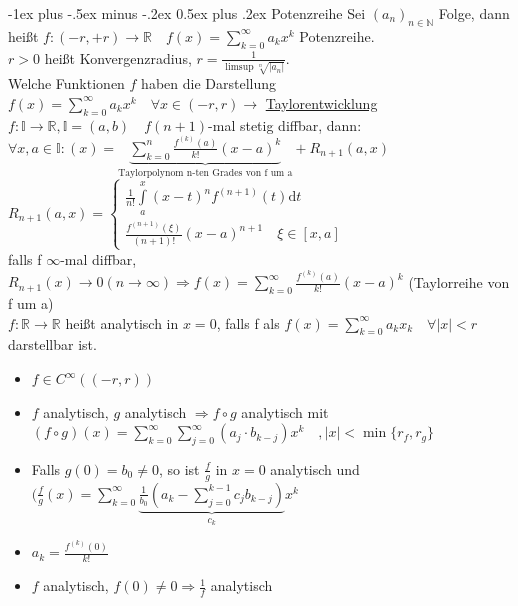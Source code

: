 \documentclass[12pt,a4paper^, twocolumn]{article}
\makeatletter
\newcommand{\menge}{\mathbb} %
\renewcommand{\d}{\mathrm{d}} %
\renewcommand{\section}{\@startsection{section}{1}{0mm}%
                                {-1ex plus -.5ex minus -.2ex}%
                                {0.5ex plus .2ex}%
                                {\normalfont\large\bfseries}}
\makeatother
\begin{document}
\section{Potenzreihe}
	Sei $(a_n)_{n\in \menge{N}}$ Folge, 
	dann heißt $f:(-r,+r) \rightarrow \menge{R} \quad f(x) = \sum\limits_{k=0}^\infty a_kx^k$ Potenzreihe. \\
	$r > 0$ heißt Konvergenzradius, $r = \frac{1}{\limsup \sqrt[n]{|a_n|}}$. \\
	Welche Funktionen $f$ haben die Darstellung $f(x) = \sum\limits_{k=0}^\infty a_kx^k \quad \forall x \in (-r,r) \rightarrow$ \underline{Taylorentwicklung} \\
	$f: \menge{I} \rightarrow \menge{R}, \menge{I} = (a,b) \quad f (n+1)$-mal stetig diffbar, dann: \\
	$\forall x,a \in \menge{I}: (x) = \underbrace{ \sum\limits_{k=0}^{n} \frac{f^{(k)} (a)}{k!}(x-a)^k }_{\text{Taylorpolynom n-ten Grades von f um a}} + R_{n+1}(a,x)$ \\
	$R_{n+1}(a,x) = \begin{cases}
		\frac{1}{n!} \int\limits_a^x(x-t)^nf^{(n+1)}(t) \d t \\
		\frac{f^{(n+1)}(\xi)}{(n+1)!} (x-a)^{n+1} \quad \xi \in [x,a]
	\end{cases}$ \\
	falls f $\infty$-mal diffbar, $R_{n+1}(x) \rightarrow 0 (n \rightarrow \infty)
	\Rightarrow f(x) = \sum\limits_{k=0}^\infty \frac{f^{(k)}(a)}{k!} (x-a)^k$ \quad (Taylorreihe von f um a) \\
	$f:\menge{R} \rightarrow \menge{R}$ heißt analytisch in $x=0$, falls f als $f(x) = \sum\limits_{k=0}^\infty a_k x_k \quad \forall |x| < r$ darstellbar ist.
	\begin{itemize}
		\item $f \in C^\infty((-r,r))$ 
		\item $f$ analytisch, $g$ analytisch $\Rightarrow f \circ g$ analytisch mit\\
			$(f \circ g)(x) = \sum\limits_{k=0}^\infty \sum\limits_{j=0}^\infty (a_j \cdot b_{k-j})x^k \quad , |x| < \min\{r_f, r_g\}$
		\item Falls $g(0) = b_0 \neq 0$, so ist $\frac{f}{g}$ in $x=0$ analytisch und
			$(\frac{f}{g}(x) = \sum\limits_{k=0}^\infty \underbrace{\frac{1}{b_0}(a_k - \sum\limits_{j=0}^{k-1} c_jb_{k-j})}_{c_k} x^k$
		\item $a_k = \frac{f^{(k)}(0)}{k!}$
		\item $f$ analytisch, $f(0) \neq 0 \Rightarrow \frac{1}{f}$ analytisch
	\end{itemize}
\end{document}
